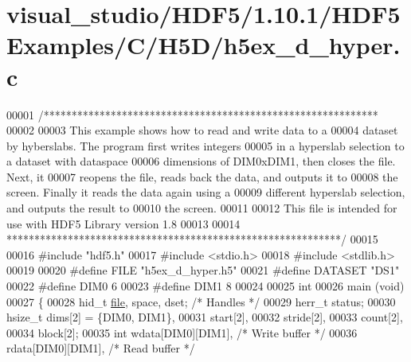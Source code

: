\hypertarget{visual__studio_2_h_d_f5_21_810_81_2_h_d_f5_examples_2_c_2_h5_d_2h5ex__d__hyper_8c_source}{}\section{visual\+\_\+studio/\+H\+D\+F5/1.10.1/\+H\+D\+F5\+Examples/\+C/\+H5\+D/h5ex\+\_\+d\+\_\+hyper.c}
\label{visual__studio_2_h_d_f5_21_810_81_2_h_d_f5_examples_2_c_2_h5_d_2h5ex__d__hyper_8c_source}

\begin{DoxyCode}
00001 \textcolor{comment}{/************************************************************}
00002 \textcolor{comment}{}
00003 \textcolor{comment}{  This example shows how to read and write data to a}
00004 \textcolor{comment}{  dataset by hyberslabs.  The program first writes integers}
00005 \textcolor{comment}{  in a hyperslab selection to a dataset with dataspace}
00006 \textcolor{comment}{  dimensions of DIM0xDIM1, then closes the file.  Next, it}
00007 \textcolor{comment}{  reopens the file, reads back the data, and outputs it to}
00008 \textcolor{comment}{  the screen.  Finally it reads the data again using a}
00009 \textcolor{comment}{  different hyperslab selection, and outputs the result to}
00010 \textcolor{comment}{  the screen.}
00011 \textcolor{comment}{}
00012 \textcolor{comment}{  This file is intended for use with HDF5 Library version 1.8}
00013 \textcolor{comment}{}
00014 \textcolor{comment}{ ************************************************************/}
00015 
00016 \textcolor{preprocessor}{#include "hdf5.h"}
00017 \textcolor{preprocessor}{#include <stdio.h>}
00018 \textcolor{preprocessor}{#include <stdlib.h>}
00019 
00020 \textcolor{preprocessor}{#define FILE            "h5ex\_d\_hyper.h5"}
00021 \textcolor{preprocessor}{#define DATASET         "DS1"}
00022 \textcolor{preprocessor}{#define DIM0            6}
00023 \textcolor{preprocessor}{#define DIM1            8}
00024 
00025 \textcolor{keywordtype}{int}
00026 main (\textcolor{keywordtype}{void})
00027 \{
00028     hid\_t       \hyperlink{structfile}{file}, space, dset;          \textcolor{comment}{/* Handles */}
00029     herr\_t      status;
00030     hsize\_t     dims[2] = \{DIM0, DIM1\},
00031                 start[2],
00032                 stride[2],
00033                 count[2],
00034                 block[2];
00035     \textcolor{keywordtype}{int}         wdata[DIM0][DIM1],          \textcolor{comment}{/* Write buffer */}
00036                 rdata[DIM0][DIM1],          \textcolor{comment}{/* Read buffer */}

\end{DoxyCode}
